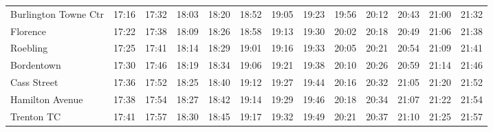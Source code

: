 \begin{center}
\begin{tabular}{@{}lrrrrrrrrrrrr@{}}
Burlington Towne Ctr & 17:16 & 17:32 & 18:03 & 18:20 & 18:52 & 19:05 & 19:23 & 19:56 & 20:12 & 20:43 & 21:00 & 21:32 \\
Florence & 17:22 & 17:38 & 18:09 & 18:26 & 18:58 & 19:13 & 19:30 & 20:02 & 20:18 & 20:49 & 21:06 & 21:38 \\
Roebling & 17:25 & 17:41 & 18:14 & 18:29 & 19:01 & 19:16 & 19:33 & 20:05 & 20:21 & 20:54 & 21:09 & 21:41 \\
Bordentown & 17:30 & 17:46 & 18:19 & 18:34 & 19:06 & 19:21 & 19:38 & 20:10 & 20:26 & 20:59 & 21:14 & 21:46 \\
Cass Street & 17:36 & 17:52 & 18:25 & 18:40 & 19:12 & 19:27 & 19:44 & 20:16 & 20:32 & 21:05 & 21:20 & 21:52 \\
Hamilton Avenue & 17:38 & 17:54 & 18:27 & 18:42 & 19:14 & 19:29 & 19:46 & 20:18 & 20:34 & 21:07 & 21:22 & 21:54 \\
Trenton TC & 17:41 & 17:57 & 18:30 & 18:45 & 19:17 & 19:32 & 19:49 & 20:21 & 20:37 & 21:10 & 21:25 & 21:57 \\
\bottomrule\end{tabular}\end{center}
